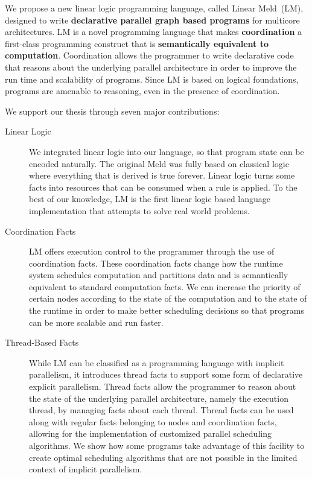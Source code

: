 
We propose a new linear logic programming language, called Linear Meld~(LM),
designed to write \textbf{declarative parallel graph based programs} for
multicore architectures. LM is a novel programming language that makes
\textbf{coordination} a first-class programming construct that is
\textbf{semantically equivalent to computation}. Coordination allows the
programmer to write declarative code that reasons about the underlying parallel
architecture in order to improve the run time and scalability of programs. Since
LM is based on logical foundations, programs are amenable to reasoning, even in
the presence of coordination.

We support our thesis through seven major contributions:

\begin{description}
   
   \item[Linear Logic]

   We integrated linear logic into our language, so that program state can be
   encoded naturally. The original Meld was fully based on classical logic where
   everything that is derived is true forever. Linear logic turns some facts
   into resources that can be consumed when a rule is applied.  To the best of
   our knowledge, LM is the first linear logic based language implementation
   that attempts to solve real world problems.

   \item[Coordination Facts]
   
   LM offers execution control to the programmer through the use of coordination
   facts. These coordination facts change how the runtime system schedules
   computation and partitions data and is semantically equivalent to standard
   computation facts. We can increase the priority of certain nodes according
   to the state of the computation and to the state of the runtime in order to
   make better scheduling decisions so that programs can be more scalable and
   run faster.

   \item[Thread-Based Facts]

   While LM can be classified as a programming language with implicit
   parallelism, it introduces thread facts to support some form of declarative explicit
   parallelism. Thread facts allow the programmer to reason about the state of
   the underlying parallel architecture, namely the execution thread, by
   managing facts about each thread. Thread facts can be used along with regular
   facts belonging to nodes and coordination facts, allowing for the
   implementation of customized parallel scheduling algorithms. We show how some
   programs take advantage of this facility to create optimal scheduling
   algorithms that are not possible in the limited context of implicit
   parallelism.
   

\end{description}
